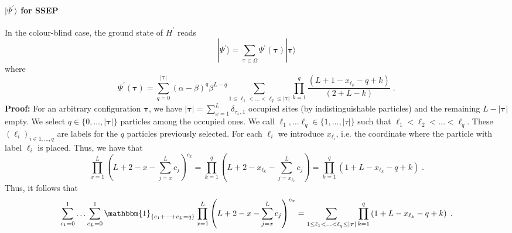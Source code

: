 \documentclass[10pt]{article}
\numberwithin{equation}{section}
\numberwithin{equation}{subsection}
\newcommand{\dt}{\;.}
\begin{document}
\paragraph{$|\Psi^{'}\rangle$ for SSEP} In the colour-blind case, the ground state of $H^{'}$ reads
\begin{equation}
	|\Psi^{'}\rangle=\sum_{\bm{\tau}\in\Omega}\Psi^{'}(\bm{\tau})|\bm{\tau}\rangle
\end{equation}
where 
\begin{equation}\label{PsiI-N2}
	\Psi^{'}(\bm{\tau})=\sum_{q=0}^{|\bm{\tau}|}(\alpha-\beta)^{q}\beta^{L-q}\sum_{1\leq \ell_{1}<\ldots<\ell_{q}\leq |\bm{\tau}|}\prod_{k=1}^{q}\frac{\left(L+1-x_{\ell_{k}}-q+k\right)}{(2+L-k)}\dt
\end{equation}
 \textbf{Proof:} For an arbitrary configuration $\bm{\tau}$, we have $|\bm{\tau}|=\sum_{x=1}^{L}\delta_{\tau_{x},1}$ occupied sites (by indistinguishable particles) and the remaining $L-|\bm{\tau}|$ empty. We select $q\in\{0,\ldots,|\bm{\tau}|\}$ particles among the occupied ones. We call $\ell_{1},\ldots\ell_{q}\in \{1,\ldots,|\tau|\}$ such that $\ell_{1}<\ell_{2}<\ldots<\ell_{q}$. These $(\ell_{i})_{i\in {1,\ldots,q}}$ are labels for the $q$ particles previously selected. For each $\ell_{i}$ we introduce $x_{\ell_{i}}$, i.e. the coordinate where the particle with label $\ell_{i}$ is placed. Thus, we have that 
\begin{equation}
	\prod_{x=1}^{L}\left(L+2-x-\sum_{j=x}^{L}c_{j}\right)^{c_{x}}=\prod_{k=1}^{q}\left(L+2-x_{\ell_{k}}-\sum_{j=x_{\ell_{k}}}^{L}c_{j}\right)=\prod_{k=1}^{q}\left(1+L-x_{\ell_{k}}-q+k\right)\dt
\end{equation}
Thus, it follows that
\begin{equation}
	\sum_{c_{1}=0}^{1}\ldots\sum_{c_{L}=0}^{1}\mathbbm{1}_{\{c_{1}+\cdots+c_{L}=q\}}	\prod_{x=1}^{L}\left(L+2-x-\sum_{j=x}^{L}c_{j}\right)^{c_{x}}=\sum_{1\leq \ell_{1}<\ldots<\ell_{q}\leq |\bm{\tau}|}\prod_{k=1}^{q}\left(1+L-x_{\ell_{k}}-q+k\right)\dt
\end{equation} 
\end{document}

